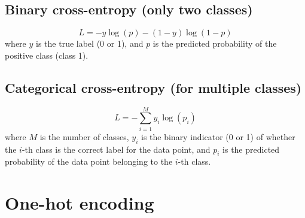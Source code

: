 \subsection{Binary cross-entropy (only two classes)}
\begin{equation}
  L = -y\log(p)-(1-y)\log(1-p)
\end{equation}
where $y$ is the true label (0 or 1), and $p$ is the predicted probability of the positive class (class 1).

\subsection{Categorical cross-entropy (for multiple classes)}
\begin{equation}
  L = -\sum_{i=1}^M y_i\log(p_i)
\end{equation}
where $M$ is the number of classes, $y_i$ is the binary indicator (0 or 1) of whether the $i$-th class is the correct label for the data point, and $p_i$ is the predicted probability of the data point belonging to the $i$-th class.

\section{One-hot encoding}


